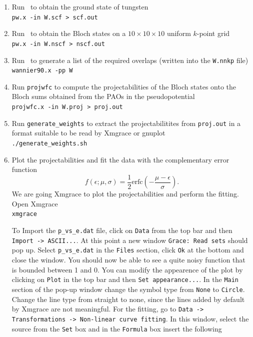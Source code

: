 \documentclass[a4paper,11pt,twoside]{article}
\begin{document}
\begin{enumerate}
	\item Run \pwscf\ to obtain the ground state of tungsten\\
	{\tt pw.x -in W.scf > scf.out}
	
	\item Run \pwscf\ to obtain the Bloch states on a $10\times10\times10$ uniform $k$-point
	grid\\ 
	{\tt pw.x -in W.nscf > nscf.out}
	
	\item Run \wannier\ to generate a list of the required overlaps (written
	into the {\tt W.nnkp} file)\\
	{\tt wannier90.x -pp W}
	
        \item Run {\tt projwfc} to compute the projectabilities of the Bloch states
              onto the Bloch sums obtained from the PAOs in the pseudopotential \\
        {\tt projwfc.x -in W.proj > proj.out}

        \item Run {\tt generate\_weights} to extract the projectabilitites from {\tt proj.out}
              in a format suitable to be read by Xmgrace or gnuplot \\
	{\tt ./generate\_weights.sh}

        \item Plot the projectabilities and fit the data with the complementary error function
              $$f(\epsilon;\mu,\sigma) = \frac{1}{2}\mathrm{erfc}(-\frac{\mu - \epsilon}{\sigma}).$$
		We are going Xmgrace to plot the projectabilities and perform the fitting. Open Xmgrace \\
	{\tt xmgrace }
		
	To Import the {\tt p\_vs\_e.dat} file, click on {\tt Data} from the top bar and then {\tt Import -> ASCII...}.
	At this point a new window {\tt Grace: Read sets} should pop up. Select {\tt p\_vs\_e.dat} in the {\tt Files} section, click {\tt Ok} at the bottom and close the window. You should now be able to see a quite noisy function that is bounded between 1 and 0. You can modify the appearence of the plot by clicking on {\tt Plot} in the top bar and then {\tt Set appearance...}. In the {\tt Main} section of the pop-up window change the symbol type from {\tt None} to {\tt Circle}. Change the line type from straight to none, since the lines added by default by Xmgrace are not meaningful. For the fitting, go to {\tt Data -> Transformations -> Non-linear curve fitting}. In this window, select the source from the {\tt Set} box and in the {\tt Formula} box insert the following \\
	

\end{enumerate}
\end{document}
